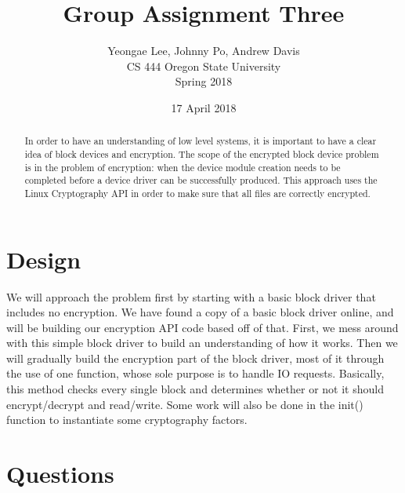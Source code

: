 \documentclass[onecolumn, draftclsnofoot,10pt, compsoc]{IEEEtran}
\title{Group Assignment Three}
\author{Yeongae Lee, Johnny Po, Andrew Davis\\CS 444 Oregon State University\\Spring 2018}
\date {17 April 2018}
\begin{document}
\begin{titlepage}
	\maketitle
    \begin{singlespace}
        \begin{abstract}
		In order to have an understanding of low level systems, it is important to have a clear idea of block devices and encryption. The scope of the encrypted block device problem is in the problem of encryption: when the device module creation needs to be completed before a device driver can be successfully produced. This approach uses the Linux Cryptography API in order to make sure that all files are correctly encrypted. 
        	
        \end{abstract}     
    \end{singlespace}
\end{titlepage}
\newpage

\section{Design}
We will approach the problem first by starting with a basic block driver that includes no encryption. We have found a copy of a basic block driver online, and will be building our encryption API code based off of that. First, we mess around with this simple block driver to build an understanding of how it works. Then we will gradually build the encryption part of the block driver, most of it through the use of one function, whose sole purpose is to handle IO requests. Basically, this method checks every single block and determines whether or not it should encrypt/decrypt and read/write. Some work will also be done in the init() function to instantiate some cryptography factors.

\section{Questions}
\end{document}
